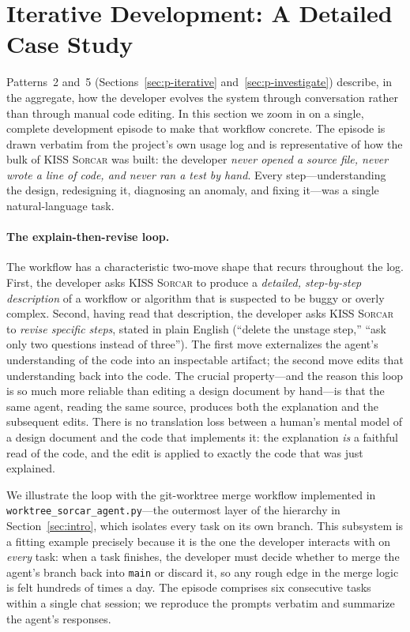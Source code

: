 \documentclass{article}
\newcommand{\kisssys}{\textsc{KISS Sorcar}}
\begin{document}
\section{Iterative Development: A Detailed Case Study}
\label{sec:iterative-case}

Patterns~2 and~5 (Sections~\ref{sec:p-iterative}
and~\ref{sec:p-investigate}) describe, in the aggregate, how the
developer evolves the system through conversation rather than through
manual code editing.
In this section we zoom in on a single, complete development episode
to make that workflow concrete.
The episode is drawn verbatim from the project's own usage log and is
representative of how the bulk of \kisssys{} was built: the developer
\emph{never opened a source file, never wrote a line of code, and never
ran a test by hand}.
Every step---understanding the design, redesigning it, diagnosing an
anomaly, and fixing it---was a single natural-language task.

\paragraph{The explain-then-revise loop.}
The workflow has a characteristic two-move shape that recurs throughout
the log.
First, the developer asks \kisssys{} to produce a \emph{detailed,
step-by-step description} of a workflow or algorithm that is suspected
to be buggy or overly complex.
Second, having read that description, the developer asks \kisssys{} to
\emph{revise specific steps}, stated in plain English (``delete the
unstage step,'' ``ask only two questions instead of three'').
The first move externalizes the agent's understanding of the code into
an inspectable artifact; the second move edits that understanding back
into the code.
The crucial property---and the reason this loop is so much more
reliable than editing a design document by hand---is that the same
agent, reading the same source, produces both the explanation and the
subsequent edits.
There is no translation loss between a human's mental model of a design
document and the code that implements it: the explanation \emph{is} a
faithful read of the code, and the edit is applied to exactly the code
that was just explained.

We illustrate the loop with the git-worktree merge workflow
implemented in \texttt{worktree\_sorcar\_agent.py}---the outermost layer
of the hierarchy in Section~\ref{sec:intro}, which isolates every task
on its own branch.
This subsystem is a fitting example precisely because it is the one
the developer interacts with on \emph{every} task: when a task
finishes, the developer must decide whether to merge the agent's branch
back into \texttt{main} or discard it, so any rough edge in the merge
logic is felt hundreds of times a day.
The episode comprises six consecutive tasks within a single chat
session; we reproduce the prompts verbatim and summarize the agent's
responses.
\end{document}
